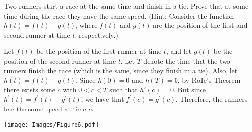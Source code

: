 \documentclass[nooutcomes]{ximera}
\renewenvironment{freeResponse}{
\ifhandout\setbox0\vbox\bgroup\else
\begin{trivlist}\item[\hskip \labelsep\bfseries Solution:\hspace{2ex}]
\fi}
{\ifhandout\egroup\else
\end{trivlist}
\fi}
\begin{document}
\begin{problem}
  Two runners start a race at the same time and finish in a tie.
  Prove that at some time during the race they have the same speed.
  (Hint:  Consider the function $h(t)=f(t)-g(t)$, where $f(t)$ and $g(t)$ are the position of the first and second runner at time $t$, respectively.)
  \begin{freeResponse}
    Let $f(t)$ be the position of the first runner at time $t$, and let $g(t)$ be the position of the second runner at time $t$.
    Let $T$ denote the time that the two runners finish the race (which is the same, since they finish in a tie).
    Also, let $h(t) = f(t) - g(t)$.
    Since $h(0) = 0$ and $h(T) = 0$, by Rolle's Theorem there exists some $c$ with $0 < c < T$ such that $h'(c)=0$.
    But since $h^\prime (t) = f^\prime (t) - g^\prime (t)$, we have that $f^\prime (c) = g^\prime (c)$.
    Therefore, the runners hae the same speed at time $c$.  

    \begin{image}
      \texttt{[image: Images/Figure6.pdf]}
    \end{image}
  \end{freeResponse}
\end{problem}
\end{document}
